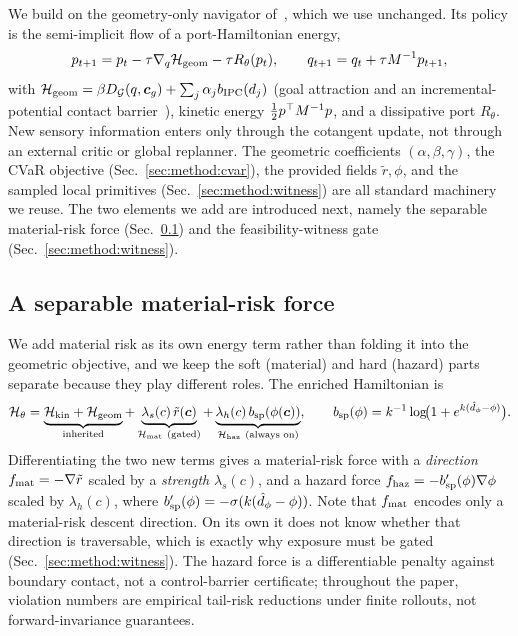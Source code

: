 We build on the geometry-only navigator of~\citet{ellendula2025grlsnam}, which we use unchanged. Its policy is the semi-implicit flow of a port-Hamiltonian energy,
\begin{equation}
p_{t+1} = p_t
  - \tau\nabla_q\mathcal{H}_{\rm geom}
  - \tau R_\theta(p_t),
\qquad
q_{t+1} = q_t + \tau M^{-1}p_{t+1},
\label{eq:method:skeleton}
\end{equation}
with $\mathcal{H}_{\rm geom}=\beta D_{\mathcal G}(q,\boldsymbol c_g)+\sum_j\alpha_j b_{\rm IPC}(d_j)$ (goal attraction and an incremental-potential contact barrier~\citep{li2020ipc}), kinetic energy $\tfrac12p^\top M^{-1}p$, and a dissipative port $R_\theta$. New sensory information enters only through the cotangent update, not through an external critic or global replanner. The geometric coefficients $(\alpha,\beta,\gamma)$, the CVaR objective (Sec.~\ref{sec:method:cvar}), the provided fields $\tilde r,\phi$, and the sampled local primitives (Sec.~\ref{sec:method:witness}) are all standard machinery we reuse. The two elements we add are introduced next, namely the separable material-risk force (Sec.~\ref{sec:method:force}) and the feasibility-witness gate (Sec.~\ref{sec:method:witness}).

\subsection{A separable material-risk force}
\label{sec:method:force}

We add material risk as its own energy term rather than folding it into the geometric objective, and we keep the soft (material) and hard (hazard) parts separate because they play different roles. The enriched Hamiltonian is
\begin{equation}
\Ham_\theta =
\underbrace{\Ham_{\rm kin}+\Ham_{\rm geom}}_{\text{inherited}}
+
\underbrace{\lambda_s(c)\,\tilde r(\vec c)}_{\Ham_{\rm mat}\ \text{(gated)}}
+
\underbrace{\lambda_h(c)\,b_{\rm sp}(\phi(\vec c))}_{\Ham_{\rm haz}\ \text{(always on)}},
\qquad
b_{\rm sp}(\phi)=k^{-1}\log\!\bigl(1+e^{k(\hat d_\phi-\phi)}\bigr).
\label{eq:method:energy}
\end{equation}
Differentiating the two new terms gives a material-risk force with a \emph{direction} $f_{\rm mat}=-\nabla\tilde r$ scaled by a \emph{strength} $\lambda_s(c)$, and a hazard force $f_{\rm haz}=-b_{\rm sp}'(\phi)\nabla\phi$ scaled by $\lambda_h(c)$, where $b_{\rm sp}'(\phi)=-\sigma(k(\hat d_\phi-\phi))$. Note that $f_{\rm mat}$ encodes only a material-risk descent direction. On its own it does not know whether that direction is traversable, which is exactly why exposure must be gated (Sec.~\ref{sec:method:witness}). The hazard force is a differentiable penalty against boundary contact, not a control-barrier certificate; throughout the paper, violation numbers are empirical tail-risk reductions under finite rollouts, not forward-invariance guarantees.

